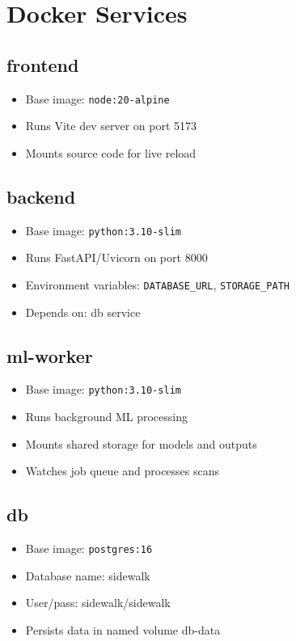 \documentclass{article}
\begin{document}
\section{Docker Services}
\subsection{frontend}
\begin{itemize}
  \item Base image: \texttt{node:20-alpine}
  \item Runs Vite dev server on port 5173
  \item Mounts source code for live reload
\end{itemize}

\subsection{backend}
\begin{itemize}
  \item Base image: \texttt{python:3.10-slim}
  \item Runs FastAPI/Uvicorn on port 8000
  \item Environment variables: \texttt{DATABASE\_URL}, \texttt{STORAGE\_PATH}
  \item Depends on: db service
\end{itemize}

\subsection{ml-worker}
\begin{itemize}
  \item Base image: \texttt{python:3.10-slim}
  \item Runs background ML processing
  \item Mounts shared storage for models and outputs
  \item Watches job queue and processes scans
\end{itemize}

\subsection{db}
\begin{itemize}
  \item Base image: \texttt{postgres:16}
  \item Database name: sidewalk
  \item User/pass: sidewalk/sidewalk
  \item Persists data in named volume db-data
\end{itemize}
\end{document}
